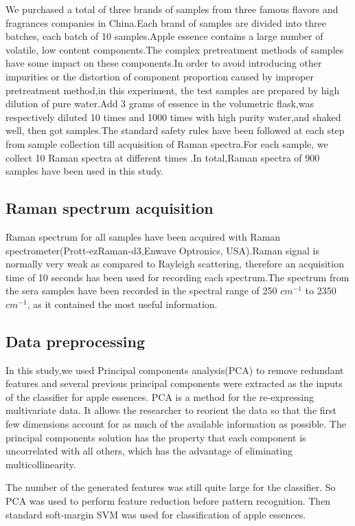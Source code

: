 \documentclass[a4paper]{article}
\begin{document}
We purchased a total of three brands of samples from three famous flavors and fragrances companies in China.Each brand of samples are divided into three batches, each batch of 10 samples.Apple essence contains a large number of volatile, low content components.The complex pretreatment methods of samples have some impact on these components.In order to avoid introducing other impurities or the distortion of component proportion caused by improper pretreatment method,in this experiment, the test samples are prepared by high dilution of pure water.Add 3 grams of essence in the volumetric flask,was respectively diluted 10 times and 1000 times with high purity water,and  shaked well, then got samples.The  standard  safety  rules  have  been  followed  at  each step from sample collection till acquisition of Raman spectra.For each sample, we collect 10 Raman spectra at different times .In total,Raman spectra of 900 samples have been used in this study.


\subsection{Raman spectrum acquisition}%
Raman spectrum for all samples have been acquired with Raman spectrometer(Prott-ezRaman-d3,Enwave Optronics, USA).Raman  signal  is  normally  very  weak  as  compared  to  Rayleigh  scattering,  therefore  an acquisition time of 10 seconds has been used for recording each spectrum.The spectrum from the  sera  samples  have  been  recorded  in  the  spectral  range  of  250 $cm^{−1}$  to  2350 $cm^{−1}$,  as  it contained the most useful information.

\subsection{Data preprocessing}%
In this study,we used Principal components analysis(PCA) to remove redundant features and several previous principal components were extracted as the inputs of the classifier for apple essences.
PCA is  a  method  for  the  re-expressing  multivariate  data.   It  allows  the researcher to reorient the data so that the first few dimensions account for as much  of  the  available  information  as  possible.  The  principal  components solution has the property that each component is uncorrelated with all others, which  has  the  advantage  of  eliminating  multicollinearity.

The number of the generated features was still quite large for  the  classifier.  So  PCA  was  used  to  perform  feature reduction  before  pattern  recognition.  Then  standard soft-margin  SVM  was  used  for  classification  of  apple essences.
\end{document}
